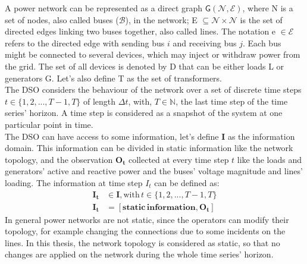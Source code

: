 
A power network can be represented as a direct graph $\mathsf{G}(\mathcal{N},\mathcal{E})$, where \gls{N} is a set of nodes, also called buses ($\mathcal{B}$), in the network; \gls{E} $\subseteq \mathcal{N} \times \mathcal{N}$ is the set of directed edges linking two buses together, also called lines. The notation \gls{e} $\in \mathcal{E}$ refers to the directed edge with sending bus $i$ and receiving bus $j$. Each bus might be connected to several devices, which may inject or withdraw power from the grid. The set of all devices is denoted by \gls{D} that can be either loads \gls{L} or generators \gls{G}. Let's also define \gls{T} as the set of transformers. \\

The \gls{DSO} considers the behaviour of the network over a set of discrete time steps $t \in \{1,2,...,T-1,T\}$ of length $\Delta t$, with, $T \in \mathbb{N}$, the last time step of the time series’ horizon. A time step is considered as a snapshot of the system at one particular point in time. \\ 

The \gls{DSO} can have access to some information, let's define $\textbf{I}$ as the information domain. This information can be divided in static information like the network topology, and the observation $\mathbf{O_t}$ collected at every time step $t$ like the loads and generators' active and reactive power and the buses' voltage magnitude and lines' loading. The information at time step $I_t$ can be defined as:
\begin{align*}
    \mathbf{I_t} & \in \mathbf{I}, \text{with} \, t \in \{1,2,...,T-1,T\} \\
    \mathbf{I_t} & = [\mathbf{{static}} \, \mathbf{{information}}, \mathbf{O_t}]
\end{align*}
\noindent In general power networks are not static, since the operators can modify their topology, for example changing the connections due to some incidents on the lines. In this thesis, the network topology is considered as static, so that no changes are applied on the network during the whole time series' horizon.\\

